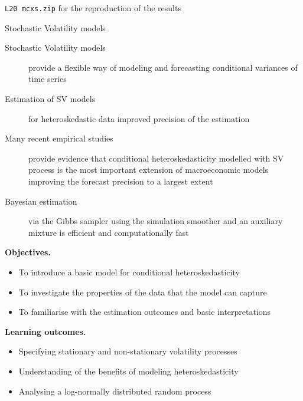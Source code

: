 \documentclass[notes,blackandwhite,mathsans,usenames,dvipsnames]{beamer}
\begin{document}
{\begin{frame}
 \texttt{L20 mcxs.zip} {\color{mcxs2}for the reproduction of the results}

\end{frame}




\begin{frame}{Stochastic Volatility models}

\begin{description}
\item[Stochastic Volatility models] {\color{mcxs2}provide a flexible way of modeling and forecasting conditional variances of time series}

\bigskip\item[Estimation of SV models] {\color{mcxs2}for heteroskedastic data improved precision of the estimation}

\bigskip\item[Many recent empirical studies] {\color{mcxs2}provide evidence that conditional heteroskedasticity modelled with SV process is the most important extension of macroeconomic models} {\color{purple}improving the forecast precision to a largest extent}

\bigskip\item[Bayesian estimation] {\color{mcxs2}via the Gibbs sampler using the simulation smoother and an} {\color{purple}auxiliary mixture} {\color{mcxs2}is efficient and computationally fast}
\end{description}
\end{frame}





\begin{frame}

\bigskip\textbf{\color{mcxs1}Objectives.}
\begin{itemize}[label=$\blacktriangleright$]
\item {\color{mcxs1}To introduce a basic model for conditional heteroskedasticity}
\item {\color{mcxs1}To investigate the properties of the data that the model can capture}
\item {\color{mcxs1}To familiarise with the estimation outcomes and basic interpretations}
\end{itemize}

\bigskip\textbf{\color{purple}Learning outcomes.}
\begin{itemize}[label=$\blacktriangleright$]
\item {\color{purple}Specifying stationary and non-stationary volatility processes}
\item {\color{purple}Understanding of the benefits of modeling heteroskedasticity}
\item {\color{purple}Analysing a log-normally distributed random process}
\end{itemize}


\end{frame}}
\end{document}
